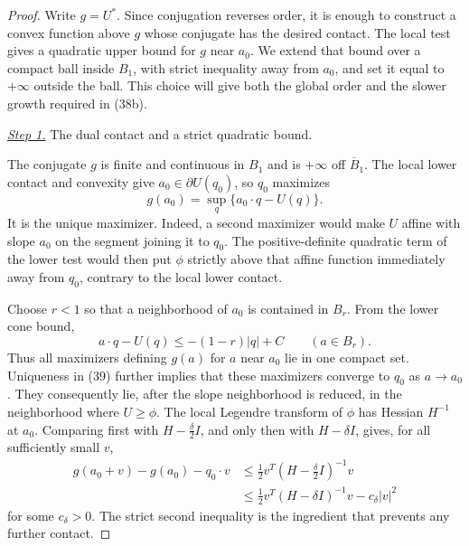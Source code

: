 \documentclass{smfart}
\theoremstyle{definition}
\newcommand{\1}{\mathbf 1}
\begin{document}
\begin{proof}
Write $g=U^*$.  Since conjugation reverses order, it is enough to
construct a convex function above $g$ whose conjugate has the desired
contact.  The local test gives a quadratic upper bound for $g$ near
$a_0$.  We extend that bound over a compact ball inside $B_1$, with
strict inequality away from $a_0$, and set it equal to $+\infty$
outside the ball.  This choice will give both the global order and
the slower growth required in (38b).

\smallskip\noindent
\underline{\textit{Step 1.}} The dual contact and a strict quadratic bound.

The conjugate $g$ is finite and continuous in $B_ 1$ and is
$+\infty$ off $\overline B_ 1$.  The local lower contact and
convexity give $a_ 0\in\partial U(q_ 0)$, so $q_ 0$ maximizes
\begin{equation}
g(a_ 0)=\sup_ q\{a_ 0\cdot q-U(q)\}.
\tag{39}
\end{equation}
It is the unique maximizer.  Indeed, a second maximizer would make
$U$ affine with slope $a_ 0$ on the segment joining it to $q_ 0$.
The positive-definite quadratic term of the lower test would then put
$\phi$ strictly above that affine function immediately away from
$q_ 0$, contrary to the local lower contact.

Choose $r<1$ so that a neighborhood of $a_ 0$ is contained in
$B_ r$.  From the lower cone bound,
\begin{equation}
a\cdot q-U(q)\leq-(1-r)|q|+C\qquad(a\in B_ r).
\tag{40}
\end{equation}
Thus all maximizers defining $g(a)$ for $a$ near $a_ 0$ lie in
one compact set.  Uniqueness in (39) further implies that these
maximizers converge to $q_ 0$ as $a\to a_ 0$.  They consequently
lie, after the slope neighborhood is reduced, in the neighborhood
where $U\geq\phi$.  The local Legendre transform of $\phi$ has
Hessian $H^{-1}$ at $a_ 0$.  Comparing first with
$H-\frac\delta2I$, and only then with $H-\delta I$, gives, for
all sufficiently small $v$,
\begin{equation}
\begin{split}
g(a_ 0+v)-g(a_ 0)-q_ 0\cdot v
&\leq\frac12v^T(H-\tfrac\delta2I)^{-1}v\\
&\leq\frac12v^T(H-\delta I)^{-1}v-c_ \delta|v|^2
\end{split}
\tag{41}
\end{equation}
for some $c_ \delta>0$.  The strict second inequality is the
ingredient that prevents any further contact.


\end{proof}
\end{document}
